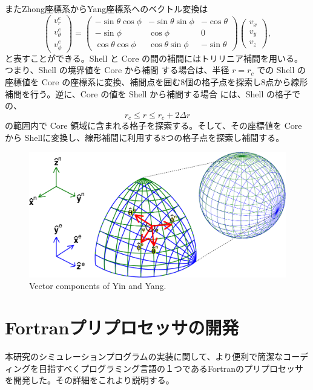 \documentclass[12pt]{jsarticle}
\begin{document}
またZhong座標系からYang座標系へのベクトル変換は
\begin{equation}
\begin{pmatrix}
v^e_r \\ v^e_\theta \\ v^e_\phi  
\end{pmatrix} 
=
\begin{pmatrix}
-\sin\theta\cos\phi & -\sin\theta\sin\phi & -\cos\theta \\ -\sin\phi & \cos\phi & 0 \\ \cos\theta\cos\phi & \cos\theta\sin\phi & -\sin\theta
\end{pmatrix} 
\begin{pmatrix}
v_x \\ v_y \\ v_z  
\end{pmatrix} ,
\end{equation}
と表すことができる。Shell と Core の間の補間にはトリリニア補間を用いる。つまり、Shell の境界値を Core から補間 する場合は、半径 $r = r_c$ での Shell の座標値を Core の座標系に変換、補間点を囲む8個の格子点を探索し8点から線形補間を行う。逆に、Core の値を Shell から補間する場合 には、Shell の格子での、
\begin{equation}
r_c \leq r \leq r_c + 2\Delta r
\end{equation}
の範囲内で Core 領域に含まれる格子を探索する。そして、その座標値を Core から Shellに変換し、線形補間に利用する8つの格子点を探索し補間する。

\begin{figure}[H]
\centering
\includegraphics[height=0.75\textheight,width=1.0\hsize,angle=0,keepaspectratio]{./Image/sphericalNormalVectors.pdf}
\caption{Vector components of Yin and Yang.} \label{fig:sphericalNormalVectors}
\end{figure}

\section{Fortranプリプロセッサの開発}
本研究のシミュレーションプログラムの実装に関して、より便利で簡潔なコーディングを目指すべくプログラミング言語の１つであるFortranのプリプロセッサを開発した。その詳細をこれより説明する。
\end{document}
